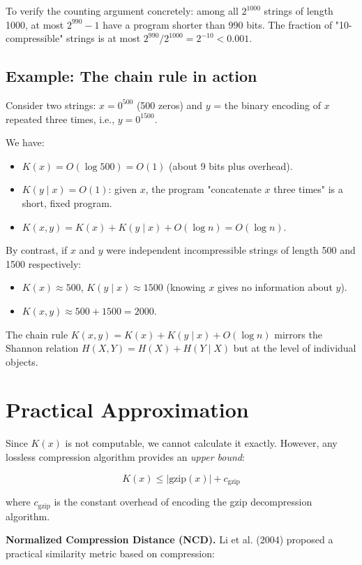 To verify the counting argument concretely: among all $2^{1000}$ strings of length 1000, at most $2^{990} - 1$ have a program shorter than 990 bits. The fraction of "10-compressible" strings is at most $2^{990}/2^{1000} = 2^{-10} < 0.001$.

\subsection*{Example: The chain rule in action}

Consider two strings: $x = 0^{500}$ (500 zeros) and $y$ = the binary encoding of $x$ repeated three times, i.e., $y = 0^{1500}$.

We have:
\begin{itemize}
\item $K(x) = O(\log 500) = O(1)$ (about 9 bits plus overhead).
\item $K(y \mid x) = O(1)$: given $x$, the program "concatenate $x$ three times" is a short, fixed program.
\item $K(x, y) = K(x) + K(y \mid x) + O(\log n) = O(\log n)$.
\end{itemize}

By contrast, if $x$ and $y$ were independent incompressible strings of length 500 and 1500 respectively:
\begin{itemize}
\item $K(x) \approx 500$, $K(y \mid x) \approx 1500$ (knowing $x$ gives no information about $y$).
\item $K(x, y) \approx 500 + 1500 = 2000$.
\end{itemize}

The chain rule $K(x, y) = K(x) + K(y \mid x) + O(\log n)$ mirrors the Shannon relation $H(X, Y) = H(X) + H(Y \mid X)$ but at the level of individual objects.



\section{Practical Approximation}

Since $K(x)$ is not computable, we cannot calculate it exactly. However, any lossless compression algorithm provides an \textit{upper bound}:

\[K(x) \leq |\text{gzip}(x)| + c_{\text{gzip}}\]

where $c_{\text{gzip}}$ is the constant overhead of encoding the gzip decompression algorithm.

\textbf{Normalized Compression Distance (NCD).} Li et al. (2004) proposed a practical similarity metric based on compression:

